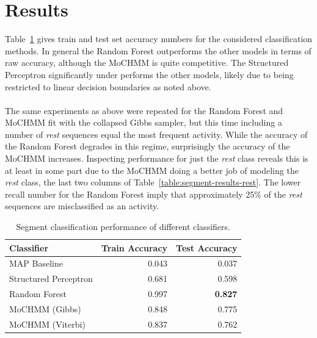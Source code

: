 \documentclass[12pt]{report}
\newcommand{\1}[0]{\mathbbm{1}}
\begin{document}
\section{Results}
Table~\ref{table:segment-results} gives train and test set accuracy numbers for the
considered classification methods. In general the Random Forest outperforms the other
models in terms of raw accuracy, although the \ac{MoCHMM} is quite competitive.
The Structured Perceptron significantly under performs the other models,
likely due to being restricted to linear decision boundaries as noted above.
\\\\
The same experiments as above were repeated for the Random Forest and \ac{MoCHMM} fit with
the collapsed Gibbs sampler, but this time including a number of \emph{rest} sequences
equal the most frequent activity. While the accuracy of the Random Forest degrades in this regime,
surprisingly the accuracy of the \ac{MoCHMM} increases. Inspecting performance for just the \emph{rest} class
reveals this is at least in some part due to the \ac{MoCHMM} doing a better job of modeling
the \emph{rest} class, the last two columns of Table~\ref{table:segment-results-rest}.
The lower recall number for the Random Forest imply that approximately 25\% of the \emph{rest}
sequences are misclassified as an activity.
\begin{table}[ht]
    \centering
    \begin{tabular}{l r r}\hline
    \textbf{Classifier} & \textbf{Train Accuracy} &\textbf{Test Accuracy} \\\hline
    MAP Baseline & 0.043 & 0.037 \\
    Structured Perceptron & 0.681 & 0.598 \\
    Random Forest & 0.997 & \textbf{0.827} \\
    MoCHMM (Gibbs) & 0.848 & 0.775 \\
    MoCHMM (Viterbi) & 0.837 & 0.762 \\
    \end{tabular}
    \caption[Performance on the segmented exercise task]{
        Segment classification performance of different classifiers.
    }
    \label{table:segment-results}
\end{table}
\end{document}
